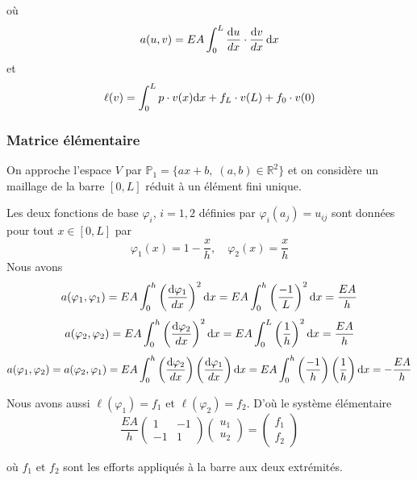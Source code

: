 \documentclass[a4paper]{article}
\def \de {{\rm d}}
\begin{document}
où \[ a(u,v)=\displaystyle EA\int_0^L\frac{\de u}{dx}\cdot \frac{\de v}{dx}\,\de x\]
et \[ \ell(v)=\displaystyle \int_0^L p\cdot v(x)\de x+f_L \cdot v(L)+f_0 \cdot v(0)\]
\subsubsection*{Matrice élémentaire}
On approche l'espace $V$ par $\mathbb{P}_1=\{ax+b,\;(a,b)\in \mathbb{R}^2\}$ et on considère un maillage de la barre $[0,L]$ réduit à un élément fini unique.

Les deux fonctions de base $\varphi_i$, $i=1,2$ définies par $\varphi_i(a_j)=u _{ij}$ sont données pour tout $x\in [0,L]$  par
\[\varphi_1(x)=1-\frac{x}{h},\quad \varphi_2(x)=\frac{x}{h}\]
Nous avons
\[a(\varphi_1,\varphi_1)=EA \int_0^h\left(\frac{\de \varphi_1}{dx}\right)^2\de x=EA \int_0^h\left(\frac{-1}{L}\right)^2\de x=\frac{EA }{h}\]
\[a(\varphi_2,\varphi_2)=EA \int_0^h\left(\frac{\de \varphi_2}{dx}\right)^2\de x=EA \int_0^L\left(\frac{1}{h}\right)^2\de x=\frac{EA }{h}\]
\[a(\varphi_1,\varphi_2)=a(\varphi_2,\varphi_1)=EA \int_0^h\left(\frac{\de \varphi_2}{dx}\right)\left(\frac{\de \varphi_1}{dx}\right)\de x=EA \int_0^h\left(\frac{-1}{h}\right)\left(\frac{1}{h}\right)\de x=-\frac{EA }{h}\]

Nous avons aussi $\ell(\varphi_1)=f_1$ et $\ell(\varphi_2)=f_2$.  D'où le système élémentaire
\[\frac{EA}{h}\left(\begin{array}{rr} 
1&-1\\-1&1
\end{array}\right) \left(\begin{array}{l} 
u_{1}\\u_{2}
\end{array}\right)=\left(\begin{array}{r} 
f_{1}\\f_{2}
\end{array}\right)
\]

où $f_1$ et $f_2$ sont les efforts appliqués à la barre aux deux extrémités.
\end{document}
